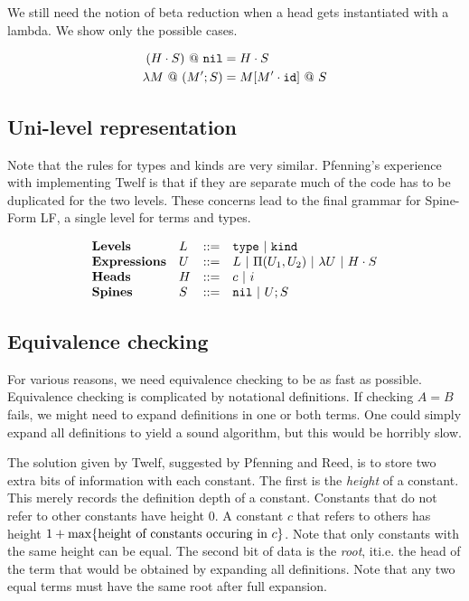 \documentclass[11pt,twoside]{article}
\begin{document}
We still need the notion of beta reduction when a 
head gets instantiated with a lambda.  We show
only the possible cases.

\bigskip 
{}

\begin{align*} 
(H\cdot S)~@~\mathtt{nil} &= H\cdot S\\
\lambda M~@~(M';S) &= M[M'\cdot\mathtt{id}]~@~ S
\end{align*} 

\subsection{Uni-level representation}

Note that the rules for types and kinds are very similar.
Pfenning's experience with implementing Twelf is that if they
are separate much of the code has to be duplicated for
the two levels.  These concerns lead to the final 
grammar for Spine-Form LF, a single level for terms and types.

$$
\begin{array}{llll}
\mathbf{Levels} & L & ::= & \mathtt{type} \ |\  \mathtt{kind} \\
\mathbf{Expressions} & U & ::= & L \ |\  \Pi(U_1,U_2) \ |\  \lambda U \ |\  H\cdot S \\
\mathbf{Heads} & H & ::= & c \ |\  i\\
\mathbf{Spines} & S & ::= & \mathtt{nil} \ |\  U;S\\
\end{array} 
$$

\subsection{Equivalence checking} \label{main:equiv}
  For various reasons, we need equivalence checking to
be as fast as possible.  Equivalence checking is complicated
by notational definitions.  If checking $A=B$ fails, we might need
to expand definitions in one or both terms.  One could simply
expand all definitions to yield a sound algorithm, but this would
be horribly slow.  

  The solution given by Twelf, suggested by 
Pfenning and Reed, is to store two extra bits of information 
with each constant.  The first is the \emph{height} of a constant.
This merely records the definition depth of a constant.  Constants that
do not refer to other constants have height 0.  A constant $c$ that refers
to others has height $1 + \max\{\mbox{height of constants occuring in } c\}$.
Note that only constants with the same height can be equal.  
The second bit of data is the \emph{root}, it{i.e.} the head of the term that would be obtained by 
expanding all definitions.  Note that any two equal terms must have the
same root after full expansion. 
\end{document}
